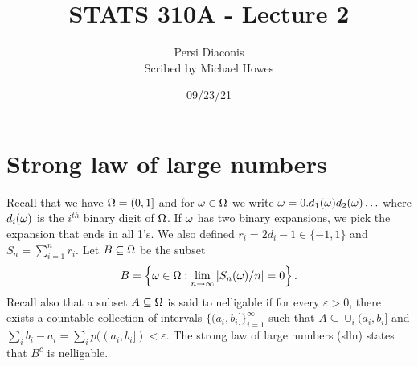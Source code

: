 




\title{STATS 310A - Lecture 2}
\author{Persi Diaconis\\ Scribed by Michael Howes}
\date{09/23/21}

\pagestyle{fancy}
\fancyhf{}


\maketitle
\tableofcontents
\section{Strong law of large numbers}
Recall that we have ${{\Omega}} = (0,1]$ and for ${\omega} \in {{\Omega}}$ we write ${\omega} = 0.d_1({\omega})d_2({\omega})\ldots$ where $d_i({\omega})$ is the $i^{th}$ binary digit of ${{\Omega}}$. If ${\omega}$ has two binary expansions, we pick the expansion that ends in all 1's. We also defined $r_i = 2d_i -1 \in \{-1,1\}$ and $S_n = \sum_{i=1}^n r_i$. Let $B \subseteq {{\Omega}}$ be the subset
\[B = \left\{{\omega} \in {{\Omega}} : \lim_{n \to \infty}{\left\lvert S_n({\omega})/n\right\rvert} = 0 \right\}.   \]
Recall also that a subset $A \subseteq {{\Omega}}$ is said to nelligable if for every $\varepsilon >0$, there exists a countable collection of intervals $\{(a_i,b_i]\}_{i=1}^\infty$ such that $A \subseteq \cup_i (a_i,b_i]$ and $\sum_i b_i-a_i = \sum_i p((a_i,b_i]) < \varepsilon$. The strong law of large numbers (slln) states that $B^c$ is nelligable.
